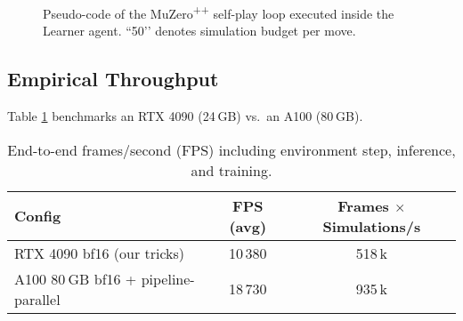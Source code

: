\begin{figure}[t]
\centering
\begin{minipage}{0.95\linewidth}
\end{minipage}
\caption{Pseudo-code of the MuZero\textsuperscript{++} self-play loop executed
inside the Learner agent.  ``50’’ denotes simulation budget per move.}
\label{alg:muzero}
\end{figure}

\subsection{Empirical Throughput}

Table \ref{tab:throughput} benchmarks an RTX 4090 (24 GB) vs.\ an A100 (80 GB).

\begin{table}[h]\centering
\caption{End-to-end frames/second (FPS) including environment step,
inference, and training.}
\label{tab:throughput}
\begin{tabular}{@{}lcc@{}}
\toprule
\textbf{Config} & \textbf{FPS (avg)} & \textbf{Frames $\times$ Simulations/s}\\
\midrule
RTX 4090 bf16 (our tricks)      & 10\,380 & 518\,k \\
A100 80 GB bf16 + pipeline-parallel & 18\,730 & 935\,k \\
\bottomrule
\end{tabular}
\end{table}

